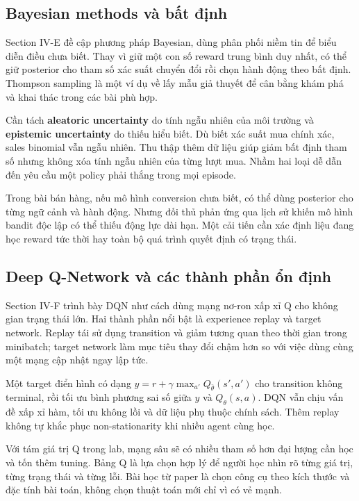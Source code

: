 \subsection{Bayesian methods và bất
định}\label{bayesian-methods-vuxe0-bux1ea5t-ux111ux1ecbnh}

Section IV-E đề cập phương pháp Bayesian, dùng phân phối niềm tin để
biểu diễn điều chưa biết. Thay vì giữ một con số reward trung bình duy
nhất, có thể giữ posterior cho tham số xác suất chuyển đổi rồi chọn hành
động theo bất định. Thompson sampling là một ví dụ về lấy mẫu giả thuyết
để cân bằng khám phá và khai thác trong các bài phù hợp.

Cần tách \textbf{aleatoric uncertainty} do tính ngẫu nhiên của môi
trường và \textbf{epistemic uncertainty} do thiếu hiểu biết. Dù biết xác
suất mua chính xác, sales binomial vẫn ngẫu nhiên. Thu thập thêm dữ liệu
giúp giảm bất định tham số nhưng không xóa tính ngẫu nhiên của từng lượt
mua. Nhầm hai loại dễ dẫn đến yêu cầu một policy phải thắng trong mọi
episode.

Trong bài bán hàng, nếu mô hình conversion chưa biết, có thể dùng
posterior cho từng ngữ cảnh và hành động. Nhưng đối thủ phản ứng qua
lịch sử khiến mô hình bandit độc lập có thể thiếu động lực dài hạn. Một
cải tiến cần xác định liệu đang học reward tức thời hay toàn bộ quá
trình quyết định có trạng thái.

\subsection{Deep Q-Network và các thành phần ổn
định}\label{deep-q-network-vuxe0-cuxe1c-thuxe0nh-phux1ea7n-ux1ed5n-ux111ux1ecbnh}

Section IV-F trình bày DQN như cách dùng mạng nơ-ron xấp xỉ Q cho không
gian trạng thái lớn. Hai thành phần nổi bật là experience replay và
target network. Replay tái sử dụng transition và giảm tương quan theo
thời gian trong minibatch; target network làm mục tiêu thay đổi chậm hơn
so với việc dùng cùng một mạng cập nhật ngay lập tức.

Một target điển hình có dạng
\(y=r+\gamma\max_{a'}Q_{\bar\theta}(s',a')\) cho transition không
terminal, rồi tối ưu bình phương sai số giữa \(y\) và \(Q_\theta(s,a)\).
DQN vẫn chịu vấn đề xấp xỉ hàm, tối ưu không lồi và dữ liệu phụ thuộc
chính sách. Thêm replay không tự khắc phục non-stationarity khi nhiều
agent cùng học.

Với tám giá trị Q trong lab, mạng sâu sẽ có nhiều tham số hơn đại lượng
cần học và tốn thêm tuning. Bảng Q là lựa chọn hợp lý để người học nhìn
rõ từng giá trị, từng trạng thái và từng lỗi. Bài học từ paper là chọn
công cụ theo kích thước và đặc tính bài toán, không chọn thuật toán mới
chỉ vì có vẻ mạnh.


